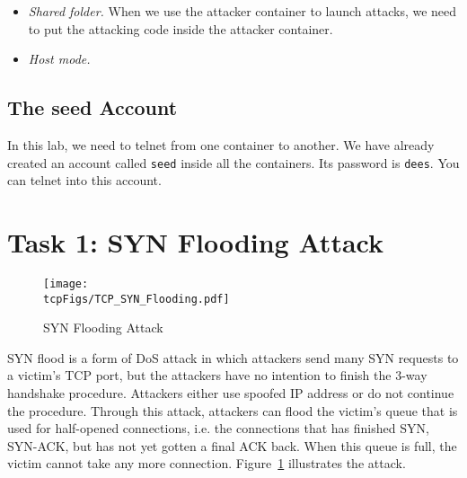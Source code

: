 \begin{itemize}
\item \textit{Shared folder.} When we use the attacker container
to launch attacks, we need to put the attacking code inside
the attacker container.



\item \textit{Host mode.}

\end{itemize}


%


\subsection{The seed Account} 

In this lab, we need to telnet from one container to another. 
We have already created an account called \texttt{seed} inside all
the containers.
Its password is \texttt{dees}. You can telnet into this account.  



\section{Task 1: SYN Flooding Attack}


\begin{figure}[htb]
  \begin{center}
    \texttt{[image: \\tcpFigs/TCP\_SYN\_Flooding.pdf]}
  \end{center}
  \caption{SYN Flooding Attack}
  \label{tcp:fig:synflooding}
\end{figure}
 


SYN flood is a form of DoS attack in which attackers send many SYN
requests to a victim's TCP port, but the attackers have no intention 
to finish the 3-way handshake procedure. Attackers either use spoofed 
IP address or do not continue the procedure. 
Through this attack, attackers can flood the victim's queue that is 
used for half-opened connections, i.e. the connections that has finished SYN, SYN-ACK, 
but has not yet gotten a final ACK back. When this queue is full, 
the victim cannot take any more connection. Figure~\ref{tcp:fig:synflooding}
illustrates the attack.

